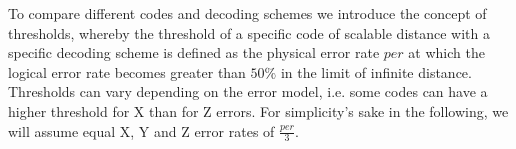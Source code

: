 To compare different codes and decoding schemes
we introduce the concept of thresholds, whereby the threshold
of a specific code of scalable distance with a specific decoding 
scheme is defined as the physical error rate $per$ at which the logical
error rate becomes greater than $50\%$ in the limit of infinite 
distance. \\
Thresholds can vary depending on the error model, i.e. 
some codes can have a higher threshold for X than for Z errors.
For simplicity's sake in the following, we will assume equal 
X, Y and Z error rates of $\frac{per}{3}$.

\begin{figure}[h!]
    \centering
    \hfill
    \hfill

\end{figure}
